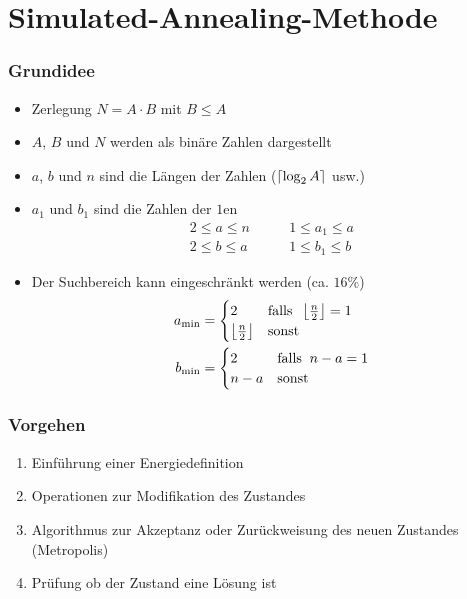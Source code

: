 \section{Simulated-Annealing-Methode}

\begin{frame}
  \frametitle{Grundidee}
  \begin{itemize}
    \item Zerlegung $N=A\cdot B$ mit $B \leq A$
    \pause{}
    \item $A$, $B$ und $N$ werden als binäre Zahlen dargestellt
    \pause{}
    \item $a$, $b$ und $n$ sind die Längen der Zahlen ($\left\lceil\log_2 A\right\rceil$ usw.)
    \pause{}
    \item $a_1$ und $b_1$ sind die Zahlen der $1$en
      \begin{align*}
        2 \leq a \leq n \quad&\quad 1 \leq a_1 \leq a \\
        2 \leq b \leq a \quad&\quad	1 \leq b_1 \leq b
      \end{align*}
    \pause{}
    \item Der Suchbereich kann eingeschränkt werden (ca. $16\%$)
      \begin{align*}
        a_{\min}&=\begin{cases} 2 & \mathrm{falls}\;\; \left\lfloor\frac{n}{2}\right\rfloor=1 \\ \left\lfloor\frac{n}{2}\right\rfloor & \mathrm{sonst} \end{cases} \\
        b_{\min}&=\begin{cases} 2 & \mathrm{falls}\;\; n-a=1 \\ n-a & \mathrm{sonst} \end{cases}
      \end{align*}
  \end{itemize}
\end{frame}

\begin{frame}
  \frametitle{Vorgehen}
  \begin{enumerate}
    \item Einführung einer Energiedefinition
    \pause{}
    \item Operationen zur Modifikation des Zustandes
    \pause{}
    \item Algorithmus zur Akzeptanz oder Zurückweisung des neuen Zustandes (Metropolis)
    \pause{}
    \item Prüfung ob der Zustand eine Lösung ist
  \end{enumerate}
\end{frame}


